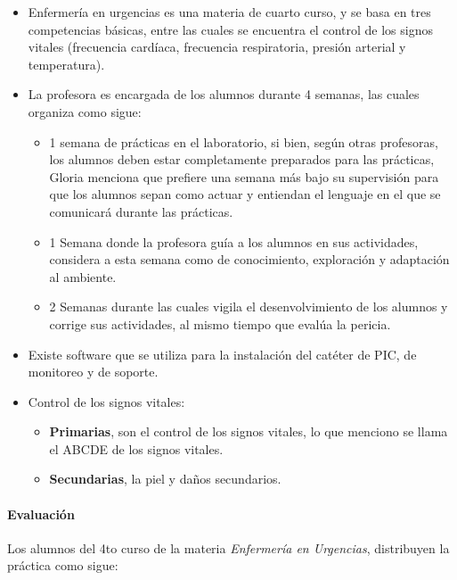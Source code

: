 \begin{itemize}
\itemsep1pt\parskip0pt
\item
  Enfermería en urgencias es una materia de cuarto curso, y se basa en
  tres competencias básicas, entre las cuales se encuentra el control de
  los signos vitales (frecuencia cardíaca, frecuencia respiratoria,
  presión arterial y temperatura).
\item
  La profesora es encargada de los alumnos durante 4 semanas, las cuales
  organiza como sigue:

  \begin{itemize}
  \itemsep1pt\parskip0pt
  \item
    1 semana de prácticas en el laboratorio, si bien, según otras
    profesoras, los alumnos deben estar completamente preparados para
    las prácticas, Gloria menciona que prefiere una semana más bajo su
    supervisión para que los alumnos sepan como actuar y entiendan el
    lenguaje en el que se comunicará durante las prácticas.
  \item
    1 Semana donde la profesora guía a los alumnos en sus actividades,
    considera a esta semana como de conocimiento, exploración y
    adaptación al ambiente.
  \item
    2 Semanas durante las cuales vigila el desenvolvimiento de los
    alumnos y corrige sus actividades, al mismo tiempo que evalúa la
    pericia.
  \end{itemize}
\item
  Existe software que se utiliza para la instalación del catéter de PIC,
  de monitoreo y de soporte.
\item
  Control de los signos vitales:

  \begin{itemize}
  \itemsep1pt\parskip0pt
  \item
    \textbf{Primarias}, son el control de los signos vitales, lo que
    menciono se llama el ABCDE de los signos vitales.
  \item
    \textbf{Secundarias}, la piel y daños secundarios.
  \end{itemize}
\end{itemize}

\paragraph{Evaluación}

Los alumnos del 4to curso de la materia \emph{Enfermería en Urgencias},
distribuyen la práctica como sigue:

